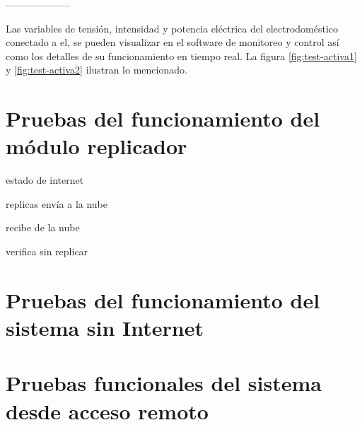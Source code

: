 --------------------

Las variables de tensión, intensidad y potencia eléctrica del electrodoméstico conectado a el, se pueden visualizar en el software de monitoreo y control así como los detalles de su funcionamiento en tiempo real. La figura \ref{fig:test-activa1} y \ref{fig:test-activa2} ilustran lo mencionado.
\section{Pruebas del funcionamiento del módulo replicador}

estado de internet

replicas envía a la nube

recibe de la nube

verifica sin replicar


\section{Pruebas del funcionamiento del sistema sin Internet}


\section{Pruebas funcionales del sistema desde acceso remoto}
